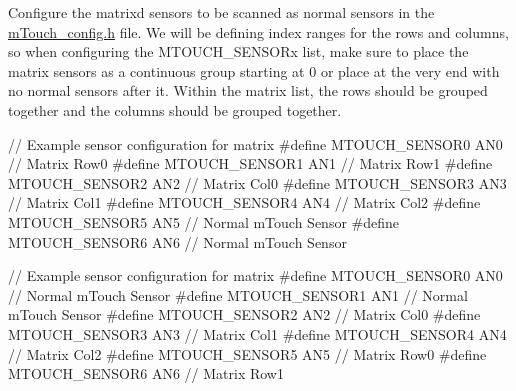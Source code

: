 \begin{DoxyEnumerate}
\item Configure the matrix\textquotesingle{}d sensors to be scanned as normal sensors in the \hyperlink{m_touch__config_8h}{m\+Touch\+\_\+config.\+h} file. We will be defining index ranges for the rows and columns, so when configuring the M\+T\+O\+U\+C\+H\+\_\+\+S\+E\+N\+S\+O\+Rx list, make sure to place the matrix sensors as a continuous group starting at 0 or place at the very end with no \textquotesingle{}normal\textquotesingle{} sensors after it. Within the matrix list, the rows should be grouped together and the columns should be grouped together. 
\begin{DoxyCode}
\textcolor{comment}{// Example sensor configuration for matrix}
\textcolor{preprocessor}{#define MTOUCH\_SENSOR0              AN0     // Matrix Row0    }
\textcolor{preprocessor}{#define MTOUCH\_SENSOR1              AN1     // Matrix Row1}
\textcolor{preprocessor}{#define MTOUCH\_SENSOR2              AN2     // Matrix Col0}
\textcolor{preprocessor}{#define MTOUCH\_SENSOR3              AN3     // Matrix Col1}
\textcolor{preprocessor}{#define MTOUCH\_SENSOR4              AN4     // Matrix Col2}
\textcolor{preprocessor}{#define MTOUCH\_SENSOR5              AN5     // Normal mTouch Sensor}
\textcolor{preprocessor}{#define MTOUCH\_SENSOR6              AN6     // Normal mTouch Sensor}
\end{DoxyCode}
 
\begin{DoxyCode}
\textcolor{comment}{// Example sensor configuration for matrix}
\textcolor{preprocessor}{#define MTOUCH\_SENSOR0              AN0     // Normal mTouch Sensor}
\textcolor{preprocessor}{#define MTOUCH\_SENSOR1              AN1     // Normal mTouch Sensor}
\textcolor{preprocessor}{#define MTOUCH\_SENSOR2              AN2     // Matrix Col0}
\textcolor{preprocessor}{#define MTOUCH\_SENSOR3              AN3     // Matrix Col1}
\textcolor{preprocessor}{#define MTOUCH\_SENSOR4              AN4     // Matrix Col2}
\textcolor{preprocessor}{#define MTOUCH\_SENSOR5              AN5     // Matrix Row0}
\textcolor{preprocessor}{#define MTOUCH\_SENSOR6              AN6     // Matrix Row1}
\end{DoxyCode}
 

\end{DoxyEnumerate}
